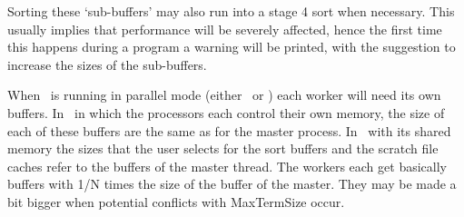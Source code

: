 Sorting these `sub-buffers' may also run into a stage 4 sort when necessary.
This usually implies that performance will be severely affected, hence the
first time this happens during a program a warning will be printed, with the
suggestion to increase the sizes of the sub-buffers.

When \FORM\ is running in parallel mode (either \TFORM\ or \ParFORM) each worker 
will need its own buffers. In \ParFORM\ in which the processors each control 
their own memory, the size of each of these buffers are the same as for the 
master process. In \TFORM\ with its shared memory the sizes that the user 
selects for the sort buffers and the scratch file caches refer to the 
buffers of the master thread. The workers each get basically buffers with 
1/N times the size of the buffer of the master. They may be made a bit 
bigger when potential conflicts with MaxTermSize occur.

